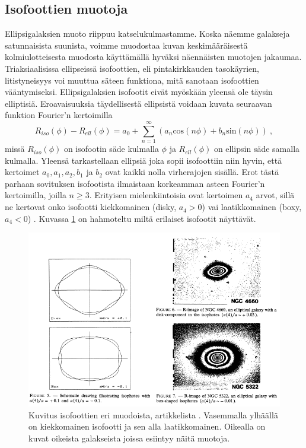 \documentclass[12pt,a4paper]{article}
\begin{document}
\subsection{Isofoottien muotoja} \label{isofootit}
Ellipsigalaksien muoto riippuu katselukulmastamme. Koska näemme galakseja satunnaisista suunista, voimme muodostaa kuvan keskimääräisestä kolmiulotteisesta muodosta käyttämällä hyväksi näennäisten muotojen jakaumaa. Triaksiaalisissa ellipseissä isofoottien, eli pintakirkkauden tasokäyrien, litistyneisyys voi muuttua säteen funktiona, mitä sanotaan isofoottien vääntymiseksi. Ellipsigalaksien isofootit eivät myöskään yleensä ole täysin elliptisiä. Eroavaisuuksia täy\-del\-li\-ses\-tä ellipsistä voidaan kuvata seuraavan funktion Fourier'n kertoimilla
\begin{equation}
R_{iso}(\phi)-R_{ell}(\phi) = a_0 + \sum^\infty_{n=1}(a_n \mathrm{cos} (n \phi) + b_n \mathrm{sin} (n \phi)) \ ,
\end{equation}
missä $R_{iso}(\phi)$ on isofootin säde kulmalla $\phi$ ja $R_{ell}(\phi)$ on ellipsin säde samalla kulmalla. Yleensä tarkastellaan ellipsiä joka sopii isofoottiin niin hyvin, että kertoimet $a_0, a_1, a_2, b_1$ ja $b_2$ ovat kaikki nolla virherajojen sisällä. Erot tästä parhaan sovituksen isofootista ilmaistaan korkeamman asteen Fourier'n kertoimilla, joilla $n\geq 3$. Erityisen mielenkiintoisia ovat kertoimen $a_4$ arvot, sillä ne kertovat onko isofootti kiekkomainen (disky, $a_4 > 0$) vai laatikkomainen (boxy, $a_4 < 0$) \citep{bender:1988}. Kuvassa \ref{fig:isofootit} on hahmoteltu miltä erilaiset isofootit näyttävät. 

\begin{figure}[h!tb]
\centering
\includegraphics[width=\textwidth]{../kuvat/isofootit.png}
\caption{Kuvitus isofoottien eri muodoista, artikkelista \cite{bender:1988}. Vasemmalla ylhäällä on kiekkomainen isofootti ja sen alla laatikkomainen. Oikealla on kuvat oikeista galakseista joissa esiintyy näitä muotoja.}
\label{fig:isofootit}
\end{figure}
 
\end{document}
